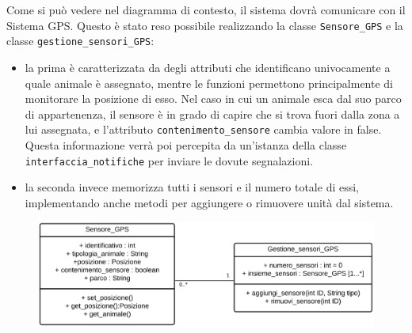 Come si può vedere nel diagramma di contesto, il sistema dovrà comunicare con il Sistema GPS.
Questo è stato reso possibile realizzando la classe \texttt{Sensore\_GPS} e la classe \texttt{gestione\_sensori\_GPS}: 
\begin{itemize}
    \item la prima è caratterizzata da degli attributi che identificano univocamente a quale animale è assegnato, mentre le funzioni permettono principalmente di monitorare la posizione di esso. Nel caso in cui un animale esca dal suo parco di appartenenza, il sensore è in grado di capire che si trova fuori dalla zona a lui assegnata, e l'attributo \texttt{contenimento\_sensore} cambia valore in false. Questa informazione verrà poi percepita da un'istanza della classe \texttt{interfaccia\_notifiche} per inviare le dovute segnalazioni.
    \item la seconda invece memorizza tutti i sensori e il numero totale di essi, implementando anche metodi per aggiungere o rimuovere unità dal sistema.
\end{itemize}

\begin{figure}[ht]
    \centering
    \includegraphics[scale=0.35]{Img/ClassSensoriGPS.eps}
\end{figure}

\newpage
